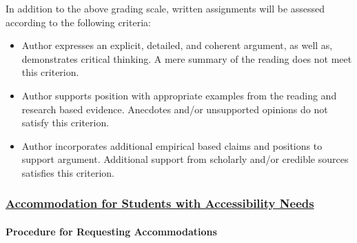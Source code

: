 \documentclass[]{article}
\providecommand{\tightlist}{%
  \setlength{\itemsep}{0pt}\setlength{\parskip}{0pt}}
\let\oldparagraph\paragraph
\renewcommand{\paragraph}[1]{\oldparagraph{#1}\mbox{}}
\begin{document}
In addition to the above grading scale, written assignments will be
assessed according to the following criteria:

\begin{itemize}
\tightlist
\item
  Author expresses an explicit, detailed, and coherent argument, as well
  as, demonstrates critical thinking. A mere summary of the reading does
  not meet this criterion.
\item
  Author supports position with appropriate examples from the reading
  and research based evidence. Anecdotes and/or unsupported opinions do
  not satisfy this criterion.
\item
  Author incorporates additional empirical based claims and positions to
  support argument. Additional support from scholarly and/or credible
  sources satisfies this criterion.
\end{itemize}

\subsubsection{\texorpdfstring{\href{http://www.wm.edu/offices/deanofstudents/services/studentaccessibilityservices/}{Accommodation
for Students with Accessibility
Needs}}{Accommodation for Students with Accessibility Needs}}\label{accommodation-for-students-with-accessibility-needs}

\paragraph{Procedure for Requesting
Accommodations}\label{procedure-for-requesting-accommodations}
\end{document}
